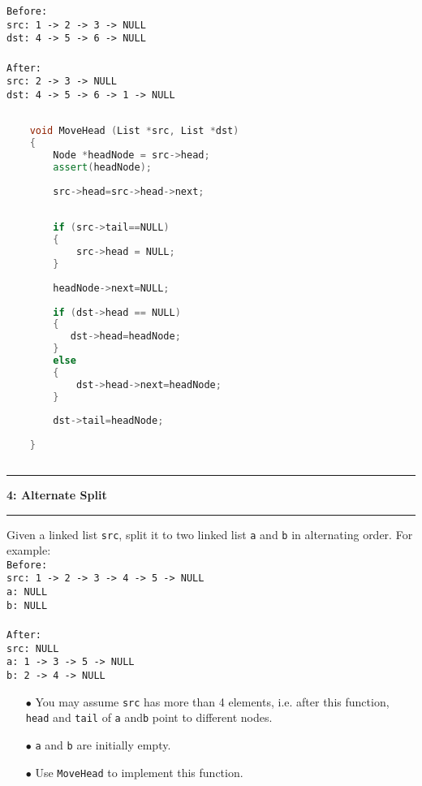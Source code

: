 \documentclass[10.5pt]{article}
\newcommand\question[2]{\vspace{.25in}\hrule\textbf{#1: #2}\vspace{.5em}\hrule\vspace{.10in}}
\begin{document}
    \texttt{Before:}\\
    \texttt{src: 1 -> 2 -> 3 -> NULL}\\
    \texttt{dst: 4 -> 5 -> 6 -> NULL}\\
    \\
    \texttt{After:}\\
    \texttt{src: 2 -> 3 -> NULL}\\
    \texttt{dst: 4 -> 5 -> 6 -> 1 -> NULL}\\
    
    
    \hrulefill
    \begin{lstlisting}[language=C++]
    
    void MoveHead (List *src, List *dst)
    {
        Node *headNode = src->head;
        assert(headNode);
        
        src->head=src->head->next;
        
            
        if (src->tail==NULL)
        {
            src->head = NULL;
        }
        
        headNode->next=NULL;
        
        if (dst->head == NULL)
        {
           dst->head=headNode;
        }
        else
        {
            dst->head->next=headNode;
        }
        
        dst->tail=headNode;
        
    }
    
    \end{lstlisting}
    \pagebreak
    
    \question{4}{Alternate Split}
    Given a linked list \texttt{src}, split it to two linked list  \texttt{a} and \texttt{b} in alternating order. For example:\\
    
    \texttt{Before:}\\
    \texttt{src: 1 -> 2 -> 3 -> 4 -> 5 -> NULL}\\
    \texttt{a: NULL}\\
    \texttt{b: NULL}\\
    \\
    \texttt{After:}\\
    \texttt{src: NULL}\\
    \texttt{a: 1 -> 3 -> 5 -> NULL}\\
    \texttt{b: 2 -> 4 -> NULL}\\
    
    \begin{enumerate}
        \item[$\bullet$] You may assume \texttt{src} has more than 4 elements, i.e. after this function, \texttt{head} and \texttt{tail} of \texttt{a} and\texttt{b} point to different nodes.
        \item[$\bullet$] \texttt{a} and \texttt{b} are initially empty.
        \item[$\bullet$] Use \texttt{MoveHead} to implement this function.
    \end{enumerate}
    
\end{document}
